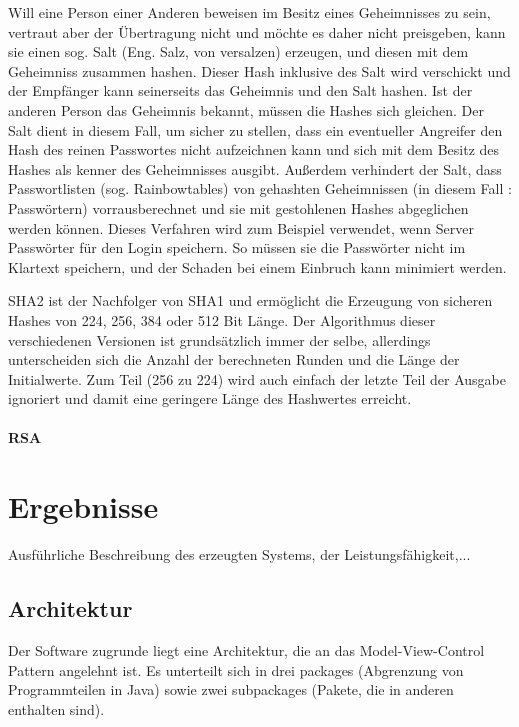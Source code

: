 \documentclass[12pt,a4paper,bibliography=totocnumbered,listof=totocnumbered]{scrartcl}
\begin{document}
Will eine Person einer Anderen beweisen im Besitz eines Geheimnisses zu sein, vertraut aber der Übertragung nicht und möchte es daher nicht preisgeben, kann sie einen sog. Salt (Eng. Salz, von versalzen) erzeugen, und diesen mit dem Geheimniss zusammen hashen. Dieser Hash inklusive des Salt wird verschickt und der Empfänger kann seinerseits das Geheimnis und den Salt hashen. Ist der anderen Person das Geheimnis bekannt, müssen die Hashes sich gleichen. Der Salt dient in diesem Fall, um sicher zu stellen, dass ein eventueller Angreifer den Hash des reinen Passwortes nicht aufzeichnen kann und sich mit dem Besitz des Hashes als kenner des Geheimnisses ausgibt. Außerdem verhindert der Salt, dass Passwortlisten (sog. Rainbowtables) von gehashten Geheimnissen (in diesem Fall : Passwörtern) vorrausberechnet und sie mit gestohlenen Hashes abgeglichen werden können. Dieses Verfahren wird zum Beispiel verwendet, wenn Server Passwörter für den Login speichern. So müssen sie die Passwörter nicht im Klartext speichern, und der Schaden bei einem Einbruch kann minimiert werden. 

SHA2 ist der Nachfolger von SHA1 und ermöglicht die Erzeugung von sicheren Hashes von 224, 256, 384 oder 512 Bit Länge. Der Algorithmus dieser verschiedenen Versionen ist grundsätzlich immer der selbe, allerdings unterscheiden sich die Anzahl der berechneten Runden und die Länge der Initialwerte. Zum Teil (256 zu 224) wird auch einfach der letzte Teil der Ausgabe ignoriert und damit eine geringere Länge des Hashwertes erreicht.
\\\cite{8}\cite{9}\cite{10}\\

\textbf{RSA}\\
\pagebreak



\section{Ergebnisse}
Ausführliche Beschreibung des erzeugten Systems, der Leistungsfähigkeit,...
\subsection{Architektur}
Der Software zugrunde liegt eine Architektur, die an das Model-View-Control Pattern angelehnt ist. Es unterteilt sich in drei packages (Abgrenzung von Programmteilen in Java) sowie zwei subpackages (Pakete, die in anderen enthalten sind).
\end{document}
